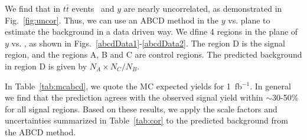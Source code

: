 We find that in $t\bar{t}$ events \Ht\ and 
$y$ are nearly uncorrelated, 
as demonstrated in Fig.~\ref{fig:uncor}.
Thus, we can use an ABCD method in the $y$ vs. \Ht
plane to estimate the background in a data driven way. We dfine 4 regions in the 
plane of $y$ vs. \Ht, as shown in Figs.~\ref{abcdData1}-\ref{abcdData2}.
The region D is the signal region, and the regions A, B and C are control regions.
The predicted background in region D is given by $N_A \times N_C / N_B$.

In Table~\ref{tab:mcabcd}, we quote the MC expected yields for 1~fb$^{-1}$. In
general we find that the prediction agrees with the observed signal yield within
$\sim$30-50\% for all signal regions. Based on these results, we apply the
scale factors and uncertainties summarized in Table~\ref{tab:cor} to the
predicted background from the ABCD method.


